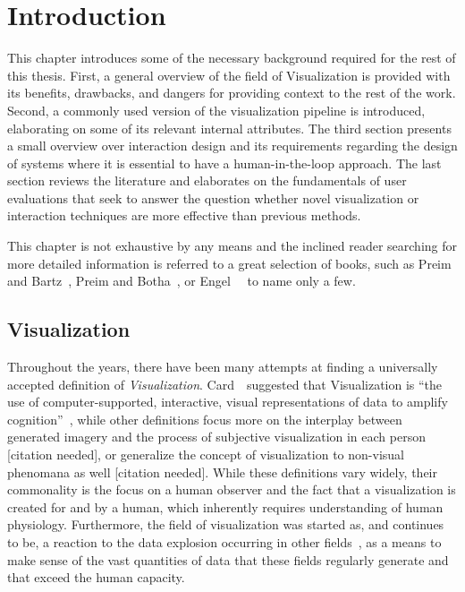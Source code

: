 \chapter{Introduction} \label{cha:intro}
This chapter introduces some of the necessary background required for the rest of this thesis.  First, a general overview of the field of Visualization is provided with its benefits, drawbacks, and dangers for providing context to the rest of the work.  Second, a commonly used version of the visualization pipeline is introduced, elaborating on some of its relevant internal attributes.  The third section presents a small overview over interaction design and its requirements regarding the design of systems where it is essential to have a human-in-the-loop approach.  The last section reviews the literature and elaborates on the fundamentals of user evaluations that seek to answer the question whether novel visualization or interaction techniques are more effective than previous methods.

This chapter is not exhaustive by any means and the inclined reader searching for more detailed information is referred to a great selection of books, such as Preim and Bartz~\cite{preim2007visualization}, Preim and Botha~\cite{preim2013visual}, or Engel~\etal~\cite{engel2006real} to name only a few.

\section{Visualization} \label{cha:intro:vis}
Throughout the years, there have been many attempts at finding a universally accepted definition of \emph{Visualization}.  Card~\etal~suggested that Visualization is ``the use of computer-supported, interactive, visual representations of data to amplify cognition''~\cite{card1999readings}, while other definitions focus more on the interplay between generated imagery and the process of subjective visualization in each person [citation needed], or generalize the concept of visualization to non-visual phenomana as well [citation needed].  While these definitions vary widely, their commonality is the focus on a human observer and the fact that a visualization is created for and by a human, which inherently requires understanding of human physiology.  Furthermore, the field of visualization was started as, and continues to be, a reaction to the data explosion occurring in other fields~\cite{lorensen2004death}, as a means to make sense of the vast quantities of data that these fields regularly generate and that exceed the human capacity.

